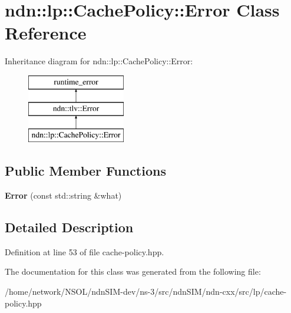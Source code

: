 \hypertarget{classndn_1_1lp_1_1CachePolicy_1_1Error}{}\section{ndn\+:\+:lp\+:\+:Cache\+Policy\+:\+:Error Class Reference}
\label{classndn_1_1lp_1_1CachePolicy_1_1Error}
Inheritance diagram for ndn\+:\+:lp\+:\+:Cache\+Policy\+:\+:Error\+:\begin{figure}[H]
\begin{center}
\leavevmode
\includegraphics[height=3.000000cm]{classndn_1_1lp_1_1CachePolicy_1_1Error}
\end{center}
\end{figure}
\subsection*{Public Member Functions}
\begin{DoxyCompactItemize}
\item 
{\bfseries Error} (const std\+::string \&what)\hypertarget{classndn_1_1lp_1_1CachePolicy_1_1Error_a1065798d18c5f304e098afca9214c12e}{}\label{classndn_1_1lp_1_1CachePolicy_1_1Error_a1065798d18c5f304e098afca9214c12e}

\end{DoxyCompactItemize}


\subsection{Detailed Description}


Definition at line 53 of file cache-\/policy.\+hpp.



The documentation for this class was generated from the following file\+:\begin{DoxyCompactItemize}
\item 
/home/network/\+N\+S\+O\+L/ndn\+S\+I\+M-\/dev/ns-\/3/src/ndn\+S\+I\+M/ndn-\/cxx/src/lp/cache-\/policy.\+hpp\end{DoxyCompactItemize}
